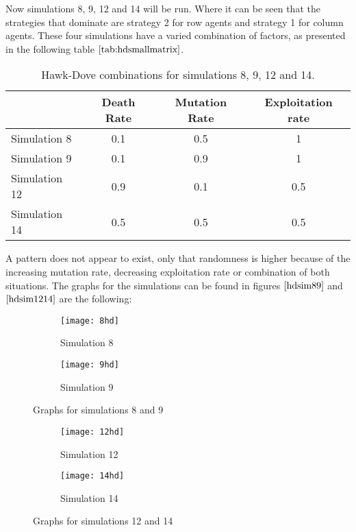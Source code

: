 Now simulations 8, 9, 12 and 14 will be run. Where it can be seen that the strategies that dominate are strategy 2 for row agents and strategy 1 for column agents. These four simulations have a varied combination of factors, as presented in the following table $\ref{tab:hdsmallmatrix}$.

\begin{table}[H]
\begin{center}

\begin{tabular}{|l|c|c|c|}
\hline
 & Death Rate & Mutation Rate & Exploitation rate\\ 
\hline
Simulation 8 & 0.1 & 0.5 & 1\\
\hline
Simulation 9 &  0.1 & 0.9 & 1\\
\hline
Simulation 12 & 0.9 & 0.1 & 0.5\\
\hline
Simulation 14 & 0.5 & 0.5 & 0.5\\
\hline
\end{tabular}
\caption{ Hawk-Dove combinations for simulations 8, 9, 12 and 14.}
\label{tab:hdsmallmatrix}	
\end{center}
\end{table}
A pattern does not appear to exist, only that randomness is higher because of the increasing mutation rate, decreasing exploitation rate or combination of both situations. The graphs for the simulations can be found in figures $\ref{hdsim89}$ and $\ref{hdsim1214}$ are the following:


\begin{figure}[H]       
    \centering
    \begin{subfigure}[b]{0.3\textwidth}
	\centering
	{\texttt{[image: 8hd]}}   
    	\caption{Simulation 8}
	\label{fig:hd8}
    \end{subfigure}
    \hfill
    \begin{subfigure}[b]{0.3\textwidth}
	\centering
	{\texttt{[image: 9hd]}}   
    	\caption{Simulation 9}
	\label{fig:hd9}
    \end{subfigure}
   \caption{Graphs for simulations 8 and 9}
    \label{hdsim89}
\end{figure}

\begin{figure}[H]       
    \centering
    \begin{subfigure}[b]{0.3\textwidth}
	\centering
	{\texttt{[image: 12hd]}}   
    	\caption{Simulation 12}
	\label{fig:hd12}
    \end{subfigure}
    \hfill
    \begin{subfigure}[b]{0.3\textwidth}
	\centering
	{\texttt{[image: 14hd]}}   
    	\caption{Simulation 14}
	\label{fig:hd14}
    \end{subfigure}
   \caption{Graphs for simulations 12 and 14}
    \label{hdsim1214}
\end{figure}

